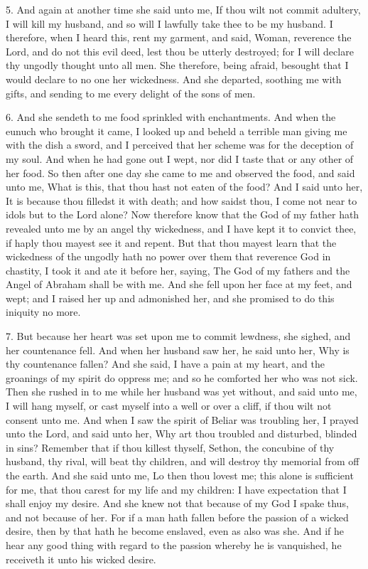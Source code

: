 5. And again at another time she said unto me, If thou wilt not commit adultery, I will kill my husband, and so will I lawfully take thee to be my husband. I therefore, when I heard this, rent my garment, and said, Woman, reverence the Lord, and do not this evil deed, lest thou be utterly destroyed; for I will declare thy ungodly thought unto all men. She therefore, being afraid, besought that I would declare to no one her wickedness. And she departed, soothing me with gifts, and sending to me every delight of the sons of men.

6. And she sendeth to me food sprinkled with enchantments. And when the eunuch who brought it came, I looked up and beheld a terrible man giving me with the dish a sword, and I perceived that her scheme was for the deception of my soul. And when he had gone out I wept, nor did I taste that or any other of her food. So then after one day she came to me and observed the food, and said unto me, What is this, that thou hast not eaten of the food? And I said unto her, It is because thou filledst it with death; and how saidst thou, I come not near to idols but to the Lord alone? Now therefore know that the God of my father hath revealed unto me by an angel thy wickedness, and I have kept it to convict thee, if haply thou mayest see it and repent. But that thou mayest learn that the wickedness of the ungodly hath no power over them that reverence God in chastity, I took it and ate it before her, saying, The God of my fathers and the Angel of Abraham shall be with me. And she fell upon her face at my feet, and wept; and I raised her up and admonished her, and she promised to do this iniquity no more.

7. But because her heart was set upon me to commit lewdness, she sighed, and her countenance fell. And when her husband saw her, he said unto her, Why is thy countenance fallen? And she said, I have a pain at my heart, and the groanings of my spirit do oppress me; and so he comforted her who was not sick. Then she rushed in to me while her husband was yet without, and said unto me, I will hang myself, or cast myself into a well or over a cliff, if thou wilt not consent unto me. And when I saw the spirit of Beliar was troubling her, I prayed unto the Lord, and said unto her, Why art thou troubled and disturbed, blinded in sins? Remember that if thou killest thyself, Sethon, the concubine of thy husband, thy rival, will beat thy children, and will destroy thy memorial from off the earth. And she said unto me, Lo then thou lovest me; this alone is sufficient for me, that thou carest for my life and my children: I have expectation that I shall enjoy my desire. And she knew not that because of my God I spake thus, and not because of her. For if a man hath fallen before the passion of a wicked desire, then by that hath he become enslaved, even as also was she. And if he hear any good thing with regard to the passion whereby he is vanquished, he receiveth it unto his wicked desire.

